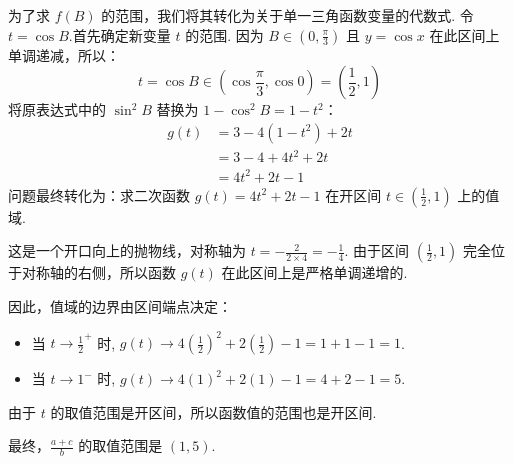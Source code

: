 \begin{prob-sol}
为了求 $f(B)$ 的范围，我们将其转化为关于单一三角函数变量的代数式.
令 $t = \cos B$.首先确定新变量 $t$ 的范围.
因为 $B \in (0, \frac{\pi}{3})$ 且 $y=\cos x$ 在此区间上单调递减，所以：
\[
t = \cos B \in \left(\cos\frac{\pi}{3}, \cos 0\right) = \left(\frac{1}{2}, 1\right)
\]
将原表达式中的 $\sin^2 B$ 替换为 $1-\cos^2 B = 1-t^2$：
\begin{align*}
	g(t) &= 3 - 4(1-t^2) + 2t \\
	&= 3 - 4 + 4t^2 + 2t \\
	&= 4t^2 + 2t - 1
\end{align*}
问题最终转化为：求二次函数 $g(t) = 4t^2+2t-1$ 在开区间 $t \in (\frac{1}{2}, 1)$ 上的值域.

这是一个开口向上的抛物线，对称轴为 $t = -\frac{2}{2 \times 4} = -\frac{1}{4}$.
由于区间 $(\frac{1}{2}, 1)$ 完全位于对称轴的右侧，所以函数 $g(t)$ 在此区间上是严格单调递增的.

因此，值域的边界由区间端点决定：
\begin{itemize}
	\item 当 $t \to \frac{1}{2}^+$ 时, $g(t) \to 4(\frac{1}{2})^2 + 2(\frac{1}{2}) - 1 = 1+1-1=1$.
	\item 当 $t \to 1^-$ 时, $g(t) \to 4(1)^2 + 2(1) - 1 = 4+2-1=5$.
\end{itemize}
由于 $t$ 的取值范围是开区间，所以函数值的范围也是开区间.

最终，$\frac{a+c}{b}$ 的取值范围是 $(1, 5)$.\hfill\qedsymbol
\end{prob-sol}
